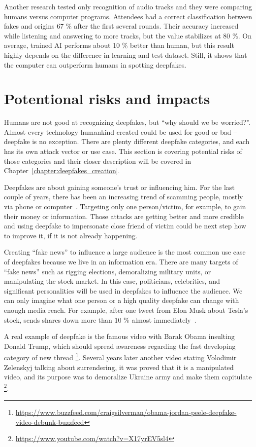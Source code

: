 Another research tested only recognition of audio tracks and they were comparing humans versus computer programs. Attendees had a correct classification between fakes and origins 67 \% after the first several rounds. Their accuracy increased while listening and answering to more tracks, but the value stabilizes at 80 \%. On average, trained AI performs about 10 \% better than human, but this result highly depends on the difference in learning and test dataset. Still, it shows that the computer can outperform humans in spotting deepfakes. \cite{HumanPerceptionAudio}

\section{Potentional risks and impacts}

Humans are not good at recognizing deepfakes, but “why should we be worried?”. Almost every technology humankind created could be used for good or bad – deepfake is no exception. There are plenty different deepfake categories, and each has its own attack vector or use case. This section is covering potential risks of those categories and their closer description will be covered in Chapter~\ref{chapter:deepfakes_creation}.

Deepfakes are about gaining someone’s trust or influencing him. For the last couple of years, there has been an increasing trend of scamming people, mostly via phone or computer~\cite{HybridVishingAttacksSkyrocketing}. Targeting only one person/victim, for example, to gain their money or information. Those attacks are getting better and more credible and using deepfake to impersonate close friend of victim could be next step how to improve it, if it is not already happening.

Creating “fake news” to influence a large audience is the most common use case of deepfakes because we live in an information era. There are many targets of “fake news” such as rigging elections, demoralizing military units, or manipulating the stock market. In this case, politicians, celebrities, and significant personalities will be used in deepfakes to influence the audience. We can only imagine what one person or a high quality deepfake can change with enough media reach. For example, after one tweet from Elon Musk about Tesla’s stock, sends shares down more than 10 \% almost immediately~\cite{ElonMusksTweets}.~\cite{IncreasingThreatofDeepfakeIdentites}

A real example of deepfake is the famous video with Barak Obama insulting Donald Trump, which should spread awareness regarding the fast developing category of new thread \footnote{\url{https://www.buzzfeed.com/craigsilverman/obama-jordan-peele-deepfake-video-debunk-buzzfeed}}. Several years later another video stating Volodimir Zelenskyj talking about surrendering, it was proved that it is a manipulated video, and its purpose was to demoralize Ukraine army and make them capitulate \footnote{\url{https://www.youtube.com/watch?v=X17yrEV5sl4}}.

